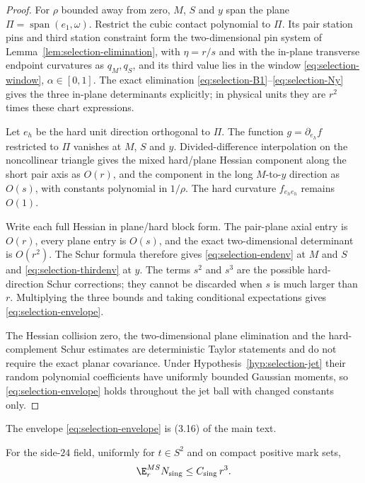 \begin{proof}
For $\rho$ bounded away from zero, $M$, $S$ and $y$ span the plane $\Pi=\operatorname{span}(e_1,\omega)$. Restrict the cubic contact polynomial to $\Pi$. Its pair station pins and third station constraint form the two-dimensional pin system of Lemma~\ref{lem:selection-elimination}, with $\eta=r/s$ and with the in-plane transverse endpoint curvatures as $q_M,q_S$, and its third value lies in the window \eqref{eq:selection-window}, $\alpha\in[0,1]$. The exact elimination \eqref{eq:selection-B1}--\eqref{eq:selection-Ny} gives the three in-plane determinants explicitly; in physical units they are $r^2$ times these chart expressions.

Let $e_h$ be the hard unit direction orthogonal to $\Pi$. The function $g=\partial_{e_h}f$ restricted to $\Pi$ vanishes at $M$, $S$ and $y$. Divided-difference interpolation on the noncollinear triangle gives the mixed hard/plane Hessian component along the short pair axis as $O(r)$, and the component in the long $M$-to-$y$ direction as $O(s)$, with constants polynomial in $1/\rho$. The hard curvature $f_{e_he_h}$ remains $O(1)$.

Write each full Hessian in plane/hard block form. The pair-plane axial entry is $O(r)$, every plane entry is $O(s)$, and the exact two-dimensional determinant is $O(r^2)$. The Schur formula therefore gives \eqref{eq:selection-endenv} at $M$ and $S$ and \eqref{eq:selection-thirdenv} at $y$. The terms $s^2$ and $s^3$ are the possible hard-direction Schur corrections; they cannot be discarded when $s$ is much larger than $r$. Multiplying the three bounds and taking conditional expectations gives \eqref{eq:selection-envelope}.

The Hessian collision zero, the two-dimensional plane elimination and the hard-complement Schur estimates are deterministic Taylor statements and do not require the exact planar covariance. Under Hypothesis~\ref{hyp:selection-jet} their random polynomial coefficients have uniformly bounded Gaussian moments, so \eqref{eq:selection-envelope} holds throughout the jet ball with changed constants only.
\end{proof}

The envelope \eqref{eq:selection-envelope} is (3.16) of the main text.

\begin{lemma}\label{lem:selection-sing}
For the side-$24$ field, uniformly for $t\in S^2$ and on compact positive mark sets,
\begin{equation}\label{eq:selection-singcount}
\E^{MS}_rN_{\rm sing}\le C_{\rm sing}\,r^3 .
\end{equation}
\end{lemma}

